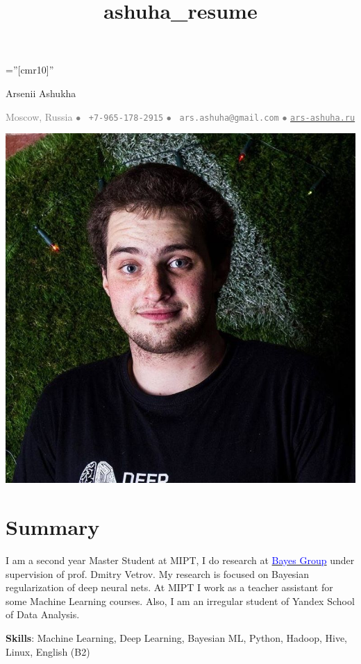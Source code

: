 \documentclass[a4paper,10pt]{article} %
\title{ashuha_resume}
\begin{document}
\pagestyle{empty} %

\font\fb=''[cmr10]'' %
\oddsidemargin=0pt 		%

\begin{center}
	{\huge Arsenii Ashukha}
\end{center}
\begin{center}
\textcolor{gray}{
Moscow, Russia $\bullet$ 
\Mobilefone~\texttt{+7-965-178-2915} $\bullet$ 
\Letter~\textcolor{gray}{\texttt{ars.ashuha@gmail.com}} $\bullet$ \href{https://ars-ashuha.ru/}{\textcolor{gray}{\texttt{ars-ashuha.ru}}}}
\end{center}
\setlength{\columnsep}{-330pt}
\begin{multicols}{2}
\includegraphics[scale=0.13]{img/avatar_rect2}

\section{Summary}
 \vspace{-0.2cm}
 
I am a second year Master Student at MIPT, I do research at \href{bayesgroup.ru}{\textcolor{blue}{Bayes Group}} under supervision of prof. Dmitry Vetrov. My research is focused on Bayesian regularization of deep neural nets. At MIPT I work as a teacher assistant for some Machine Learning courses. Also, I am an irregular student of Yandex School of Data Analysis.
 

\textbf{Skills}: Machine Learning, Deep Learning, Bayesian ML, Python, Hadoop, Hive, Linux, English (B2)

\end{multicols}
\end{document}
